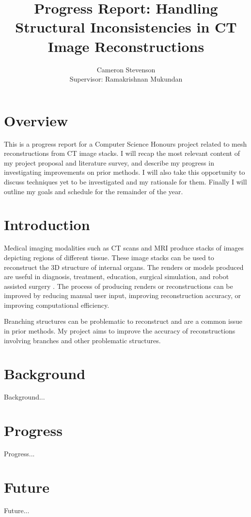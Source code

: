 \documentclass[12pt]{article}
\title{Progress Report: Handling Structural Inconsistencies in CT Image Reconstructions}
\author{Cameron Stevenson\\[1cm]{\small Supervisor: Ramakrishnan Mukundan}}
\begin{document}
\maketitle

\section{Overview}

This is a progress report for a Computer Science Honours project related to mesh reconstructions from CT image stacks. I will recap the most relevant content of my project proposal and literature survey, and describe my progress in investigating improvements on prior methods. I will also take this opportunity to discuss techniques yet to be investigated and my rationale for them. Finally I will outline my goals and schedule for the remainder of the year.

\section{Introduction}

Medical imaging modalities such as CT scans and MRI produce stacks of images depicting regions of different tissue. These image stacks can be used to reconstruct the 3D structure of internal organs. The renders or models produced are useful in diagnosis, treatment, education, surgical simulation, and robot assisted surgery \cite{mackay2019robust, mukundan2016reconstruction}. The process of producing renders or reconstructions can be improved by reducing manual user input, improving reconstruction accuracy, or improving computational efficiency.

Branching structures can be problematic to reconstruct and are a common issue in prior methods. My project aims to improve the accuracy of reconstructions involving branches and other problematic structures.

\section{Background}

Background...

\section{Progress}

Progress...

\section{Future}

Future...

\pagebreak


\end{document}
